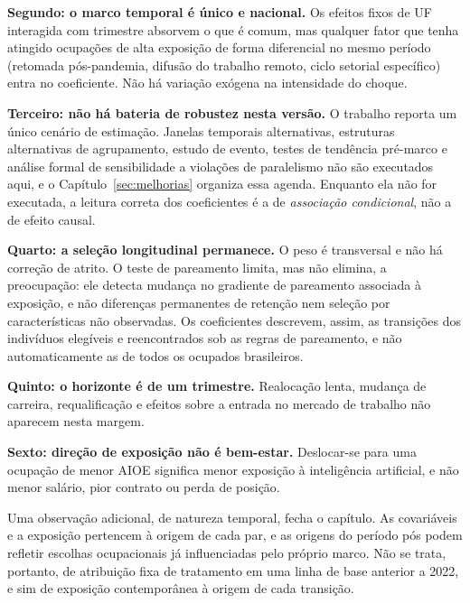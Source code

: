 \textbf{Segundo: o marco temporal é único e nacional.} Os efeitos fixos de UF
interagida com trimestre absorvem o que é comum, mas qualquer fator que tenha
atingido ocupações de alta exposição de forma diferencial no mesmo período
(retomada pós-pandemia, difusão do trabalho remoto, ciclo setorial específico)
entra no coeficiente. Não há variação exógena na intensidade do choque.

\textbf{Terceiro: não há bateria de robustez nesta versão.} O trabalho reporta
um único cenário de estimação. Janelas temporais alternativas, estruturas
alternativas de agrupamento, estudo de evento, testes de tendência pré-marco e
análise formal de sensibilidade a violações de paralelismo não são executados
aqui, e o Capítulo~\ref{sec:melhorias} organiza essa agenda. Enquanto ela não for
executada, a leitura correta dos coeficientes é a de \emph{associação
condicional}, não a de efeito causal.

\textbf{Quarto: a seleção longitudinal permanece.} O peso é transversal e não há
correção de atrito. O teste de pareamento limita, mas não elimina, a
preocupação: ele detecta mudança no gradiente de pareamento associada à
exposição, e não diferenças permanentes de retenção nem seleção por
características não observadas. Os coeficientes descrevem, assim, as
transições dos indivíduos elegíveis e reencontrados sob as regras de
pareamento, e não automaticamente as de todos os ocupados brasileiros.

\textbf{Quinto: o horizonte é de um trimestre.} Realocação lenta, mudança de
carreira, requalificação e efeitos sobre a entrada no mercado de trabalho não
aparecem nesta margem.

\textbf{Sexto: direção de exposição não é bem-estar.} Deslocar-se para uma
ocupação de menor AIOE significa menor exposição à inteligência artificial, e
não menor salário, pior contrato ou perda de posição.

Uma observação adicional, de natureza temporal, fecha o capítulo. As covariáveis
e a exposição pertencem à origem de cada par, e as origens do período pós podem
refletir escolhas ocupacionais já influenciadas pelo próprio marco. Não se trata,
portanto, de atribuição fixa de tratamento em uma linha de base anterior a 2022,
e sim de exposição contemporânea à origem de cada transição.
